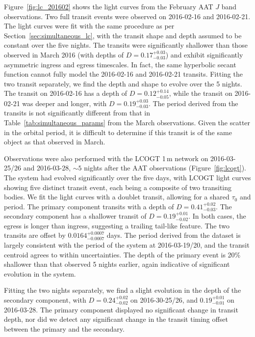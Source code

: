 \documentclass[iop,useAMES,usenatbig]{emulateapj}
\begin{document}
Figure~\ref{fig:lc_201602} shows the light curves from the February AAT $J$ band observations. Two full transit events were observed on 2016-02-16 and 2016-02-21. The light curves were fit with the same procedure as per Section~\ref{sec:simultaneous_lc}, with the transit shape and depth assumed to be constant over the five nights. The transits were significantly shallower than those observed in March 2016 (with depths of $D=0.17_{-0.03}^{+0.03}$) and exhibit significantly asymmetric ingress and egress timescales. In fact, the same hyperbolic secant function cannot fully model the 2016-02-16 and 2016-02-21 transits. Fitting the two transit separately, we find the depth and shape to evolve over the 5 nights. The transit on 2016-02-16 has a depth of $D = 0.12_{-0.05}^{+0.14}$, while the transit on 2016-02-21 was deeper and longer, with $D = 0.19_{-0.03}^{+0.03}$. The period derived from the transits is not significantly different from that in Table~\ref{tab:simultaneous_params} from the March observations. Given the scatter in the orbital period, it is difficult to determine if this transit is of the same object as that observed in March.

Observations were also performed with the LCOGT 1\,m network on 2016-03-25/26 and 2016-03-28, $\sim 5$ nights after the AAT observations (Figure~\ref{fig:lcogt}). The system had evolved significantly over the five days, with LCOGT light curves showing five distinct transit event, each being a composite of two transiting bodies. We fit the light curves with a doublet transit, allowing for a shared $\tau_0$ and period. The primary component transits with a depth of $D = 0.41_{-0.03}^{+0.02}$. The secondary component has a shallower transit of $D = 0.19_{-0.02}^{+0.01}$. In both cases, the egress is longer than ingress, suggesting a trailing tail-like feature. The two transits are offset by $0.0164_{-0.0007}^{+0.0007}$ days. The period derived from the dataset is largely consistent with the period of the system at 2016-03-19/20, and the transit centroid agrees to within uncertainties. The depth of the primary event is 20\% shallower than that observed 5 nights earlier, again indicative of significant evolution in the system. 

Fitting the two nights separately, we find a slight evolution in the depth of the secondary component, with $D=0.24_{-0.02}^{+0.02}$ on 2016-30-25/26, and $0.19_{-0.01}^{+0.01}$ on 2016-03-28. The primary component displayed no significant change in transit depth, nor did we detect any significant change in the transit timing offset between the primary and the secondary.
\end{document}
